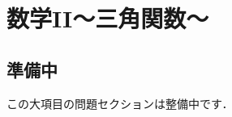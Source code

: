 \documentclass[../../ms_q.tex]{subfiles}
\begin{document}
\section{数学II～三角関数～}

\subsection*{準備中}
この大項目の問題セクションは整備中です．
\end{document}
